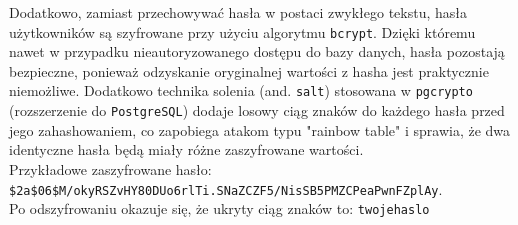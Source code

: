 Dodatkowo, zamiast przechowywać hasła w postaci zwykłego tekstu, hasła użytkowników są szyfrowane przy użyciu algorytmu \texttt{bcrypt}. Dzięki któremu nawet w przypadku nieautoryzowanego dostępu do bazy danych, hasła pozostają bezpieczne, ponieważ odzyskanie oryginalnej wartości z hasha jest praktycznie niemożliwe. Dodatkowo technika solenia (and. \texttt{salt}) stosowana w \texttt{pgcrypto} (rozszerzenie do \texttt{PostgreSQL}) dodaje losowy ciąg znaków do każdego hasła przed jego zahashowaniem, co zapobiega atakom typu "rainbow table" i sprawia, że dwa identyczne hasła będą miały różne zaszyfrowane wartości. \\
Przykładowe zaszyfrowane hasło: \\
\texttt{\$2a\$06\$M/okyRSZvHY80DUo6rlTi.SNaZCZF5/NisSB5PMZCPeaPwnFZplAy}. \\
Po odszyfrowaniu okazuje się, że ukryty ciąg znaków to: \texttt{twojehaslo}
